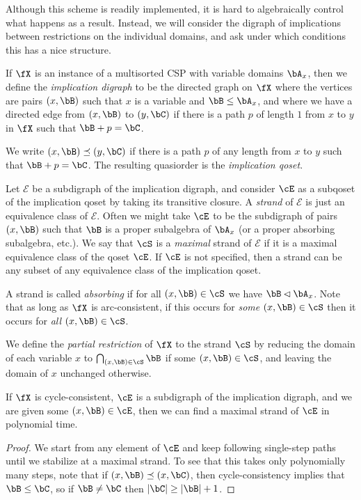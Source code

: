 Although this scheme is readily implemented, it is hard to algebraically control what happens as a result. Instead, we will consider the digraph of implications between restrictions on the individual domains, and ask under which conditions this has a nice structure.

\begin{defn} If $\fX$ is an instance of a multisorted CSP with variable domains $\bA_x$, then we define the \emph{implication digraph} to be the directed graph on $\fX$ where the vertices are pairs $(x, \bB)$ such that $x$ is a variable and $\bB \le \bA_x$, and where we have a directed edge from $(x,\bB)$ to $(y,\bC)$ if there is a path $p$ of length $1$ from $x$ to $y$ in $\fX$ such that $\bB + p = \bC$.

We write $(x,\bB) \preceq (y,\bC)$ if there is a path $p$ of any length from $x$ to $y$ such that $\bB + p = \bC$. The resulting quasiorder is the \emph{implication qoset}.

Let $\mathcal{E}$ be a subdigraph of the implication digraph, and consider $\cE$ as a subqoset of the implication qoset by taking its transitive closure. A \emph{strand} of $\mathcal{E}$ is just an equivalence class of $\mathcal{E}$. Often we might take $\cE$ to be the subdigraph of pairs $(x,\bB)$ such that $\bB$ is a proper subalgebra of $\bA_x$ (or a proper absorbing subalgebra, etc.). We say that $\cS$ is a \emph{maximal} strand of $\mathcal{E}$ if it is a maximal equivalence class of the qoset $\cE$. If $\cE$ is not specified, then a strand can be any subset of any equivalence class of the implication qoset.

A strand is called \emph{absorbing} if for all $(x,\bB) \in \cS$ we have $\bB \lhd \bA_x$. Note that as long as $\fX$ is arc-consistent, if this occurs for \emph{some} $(x,\bB) \in \cS$ then it occurs for \emph{all} $(x,\bB) \in \cS$.

We define the \emph{partial restriction} of $\fX$ to the strand $\cS$ by reducing the domain of each variable $x$ to $\bigcap_{(x,\bB)\in\cS} \bB$ if some $(x,\bB) \in \cS$, and leaving the domain of $x$ unchanged otherwise.
\end{defn}

\begin{prop}\label{prop-cycle-strand-finding} If $\fX$ is cycle-consistent, $\cE$ is a subdigraph of the implication digraph, and we are given some $(x,\bB) \in \cE$, then we can find a maximal strand of $\cE$ in polynomial time.
\end{prop}
\begin{proof} We start from any element of $\cE$ and keep following single-step paths until we stabilize at a maximal strand. To see that this takes only polynomially many steps, note that if $(x,\bB) \preceq (x,\bC)$, then cycle-consistency implies that $\bB \le \bC$, so if $\bB \ne \bC$ then $|\bC| \ge |\bB|+1$.
\end{proof}

